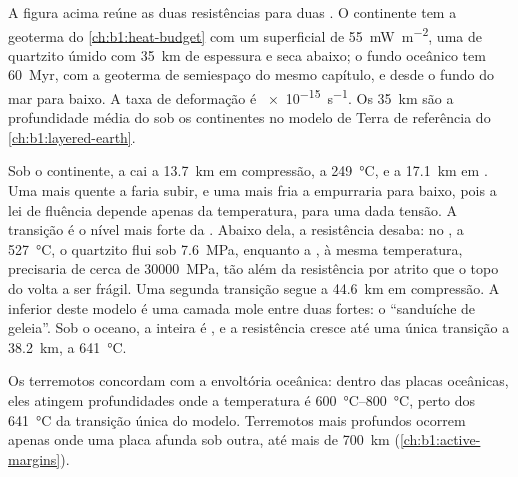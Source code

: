 A figura acima reúne as duas resistências
para duas . O continente tem a geoterma do \cref{ch:b1:heat-budget} com um  superficial de \qty{55}{mW.m^{-2}}, uma  de quartzito úmido com \qty{35}{km} de espessura e  seca abaixo; o fundo oceânico tem \qty{60}{Myr}, com a geoterma de semiespaço do mesmo capítulo, e  desde o fundo do mar para baixo. A taxa de deformação é
\qty{e-15}{s^{-1}}. Os \qty{35}{km} são a profundidade média do  sob os continentes no modelo de Terra de referência do \cref{ch:b1:layered-earth}.

Sob o continente, a  cai a \qty{13.7}{km} em compressão, a \qty{249}{\degreeCelsius}, e a \qty{17.1}{km} em . Uma  mais quente a faria subir, e uma mais fria a empurraria para baixo, pois a lei de fluência depende apenas da temperatura, para uma dada tensão. A transição é o nível mais forte da .
Abaixo dela, a resistência desaba: no , a \qty{527}{\degreeCelsius}, o quartzito flui sob \qty{7.6}{MPa}, enquanto a , à mesma temperatura, precisaria de cerca de \qty{30000}{MPa}, tão além da resistência por atrito que o topo do  volta a ser frágil. Uma segunda transição segue a \qty{44.6}{km} em compressão. A  inferior deste modelo é uma camada mole entre duas fortes: o ``sanduíche de geleia''. Sob o oceano, a  inteira é , e a resistência cresce até uma única transição a \qty{38.2}{km}, a \qty{641}{\degreeCelsius}.

Os terremotos concordam com a envoltória oceânica: dentro das placas oceânicas, eles atingem profundidades onde a temperatura é
\qtyrange{600}{800}{\degreeCelsius}, perto dos \qty{641}{\degreeCelsius} da transição única do modelo. Terremotos mais profundos ocorrem apenas onde uma placa afunda sob outra, até mais de \qty{700}{km}
(\cref{ch:b1:active-margins}).

